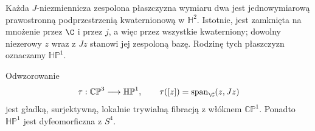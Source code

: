 Każda $J$-niezmiennicza zespolona
płaszczyzna wymiaru dwa jest
jednowymiarową prawostronną
podprzestrzenią kwaternionową
w $\mathbb H^2$. Istotnie, jest
zamknięta na mnożenie przez
$\C$ i przez $j$, a więc przez
wszystkie kwaterniony; dowolny
niezerowy $z$ wraz z $Jz$
stanowi jej zespoloną bazę.
Rodzinę tych płaszczyzn oznaczamy
$\mathbb{HP}^1$.

\begin{twierdzenie}
\label{thm:lin32-fibracja}
Odwzorowanie
\begin{equation}\label{eq:lin32-fibracja}
 \tau:\mathbb{CP}^3\longrightarrow\mathbb{HP}^1,
 \qquad \tau([z])=\operatorname{span}_\C(z,Jz)
\end{equation}
jest gładką, surjektywną, lokalnie trywialną
fibracją z włóknem $\mathbb{CP}^1$.
Ponadto $\mathbb{HP}^1$ jest
dyfeomorficzna z $S^4$.
\end{twierdzenie}
